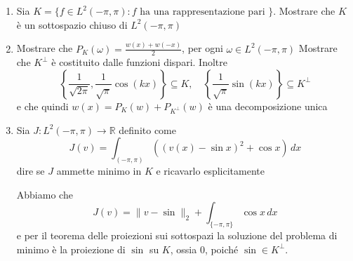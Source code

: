 \begin{eser}
\begin{enumerate}[label = \alph*.]
    \item Sia \(K = \{f \in L^2{(-\pi, \pi)}: f \text{ ha una rappresentazione
        pari }\}\). Mostrare che \(K\) è un sottospazio chiuso di \(L^2{(-\pi,
        \pi)}\)
    \item Mostrare che \(P_K{(\omega)}  = \frac{w{(x)} + w{(-x)}}{2}\), per ogni
        \(\omega \in L^2{(-\pi, \pi)}\) 
      Mostrare che \(K^{\perp}\) è costituito dalle funzioni dispari.
      Inoltre 
      \[
          \left\{ \frac{1}{\sqrt{2\pi}}, \frac{1}{\sqrt{\pi}} \cos{(kx)}
              \right\} \subseteq K, \quad \left\{ \frac{1}{\sqrt{\pi}}
              \sin{(kx)} \right\} \subseteq K^{\perp}
      \]
        e che quindi \(w{(x)} = P_K{(w)} + P_{K^{\perp}}{(w)} \) è una
        decomposizione unica
    \item Sia \(J : L^2{(-\pi, \pi)} \to \mathbb{R}\) definito come
        \[
          J{(v)} = \int _{{(-\pi, \pi)}} {\left( {\left( v{(x)}-\sin x \right)}
          ^2 + \cos x\right)}  \,dx
        \]
        dire se \(J\) ammette minimo in \(K\) e ricavarlo esplicitamente

        Abbiamo che 
        \[
          J{(v)} = \|v - \sin\|_{2} + \int _{\{-\pi, \pi\} } \cos x \,dx
        \]
        e per il teorema delle proiezioni sui sottospazi la soluzione del
        problema di minimo è la proiezione di \(\sin\) su \(K\), ossia 0, poiché
        \(\sin \in K^{\perp}\).
\end{enumerate}
\end{eser}
